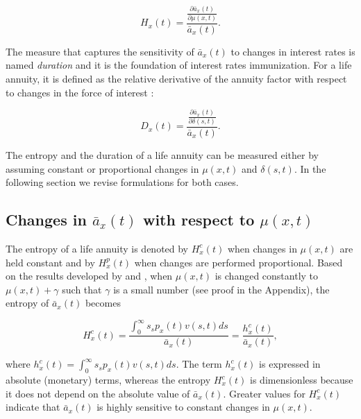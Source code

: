 \documentclass[12pt]{article}
\begin{document}
\begin{equation}\label{eq:EntropyGeneral}
{H}_{x}(t) = \frac{ \frac{\partial \bar{a}_x(t) }{\partial \mu(x,t)}}{\bar{a}_x(t)}.
\end{equation}

The measure that captures the sensitivity of $\bar{a}_x(t)$ to changes in interest rates is named \textit{duration} and it is the foundation of interest rates immunization. For a life annuity, it is defined as the relative derivative of the annuity factor with respect to changes in the force of interest \citep{Milevsky2012}:


\begin{equation}\label{eq:EntropyGeneral}
{D}_{x}(t) = \frac{ \frac{\partial \bar{a}_x(t) }{\partial \delta(s,t)}}{\bar{a}_x(t)}.
\end{equation}


The entropy and the duration of a life annuity can be measured either by assuming constant or proportional changes in $\mu(x,t)$ and $\delta(s,t)$. In the following section we revise formulations for both cases. 



\subsection{Changes in $\bar{a}_x(t)$ with respect to $\mu(x,t)$}

The entropy of a life annuity is denoted by ${H}^{c}_{x}(t)$ when changes in $\mu(x,t)$ are held constant and by ${H}^{p}_{x}(t)$ when  changes are performed proportional. Based on the results developed by \citet{Tsai2013a} and \citet{Lin2020}, when $\mu(x,t)$ is changed constantly to $\mu(x,t)+\gamma$ such that $\gamma$ is a small number (see proof in the Appendix), the entropy of $\bar{a}_x(t)$ becomes

\begin{equation}\label{eq:EntropyC}
{H}^{c}_{x}(t) = \frac{\int_{0}^\infty s {}_sp_x(t) {v}(s,t) ds}{\bar{a}_x(t)}=\frac{{h}^{c}_{x}(t)}{\bar{a}_x(t)},
\end{equation}

where ${h}^{c}_{x}(t)=\int_{0}^\infty s {}_sp_x(t) {v}(s,t) ds$. The term ${h}^{c}_{x}(t)$ is expressed in absolute (monetary) terms, whereas the entropy ${H}^{c}_{x}(t)$ is dimensionless because it does not depend on the absolute value of $\bar{a}_x(t)$. Greater values for ${H}^{c}_{x}(t)$ indicate that $\bar{a}_x(t)$ is highly sensitive to constant changes in $\mu(x,t)$.
\end{document}
